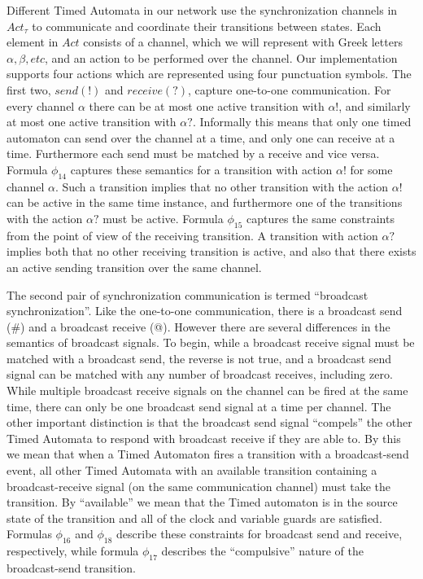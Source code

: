 \documentclass[a4paper,12pt]{article}
\begin{document}
Different Timed Automata in our network use the synchronization channels in
\(Act_\tau\) to communicate and coordinate their transitions between states.
Each element in \(Act\) consists of a channel, which we will represent with
Greek letters \(\alpha, \beta, etc\), and an action to be performed over the
channel. Our implementation supports four actions which are represented using
four punctuation symbols. The first two, \(send(!)\) and \(receive(?)\), capture
one-to-one communication. For every channel \(\alpha\) there can be at most one
active transition with \(\alpha!\), and similarly at most one active transition
with \(\alpha?\). Informally this means that only one timed automaton can send
over the channel at a time, and only one can receive at a time. Furthermore each
send must be matched by a receive and vice versa. Formula \(\phi_{14}\) captures
these semantics for a transition with action \(\alpha!\) for some channel
\(\alpha\). Such a transition implies that no other transition with the action
\(\alpha!\) can be active in the same time instance, and furthermore one of the
transitions with the action \(\alpha?\) must be active. Formula \(\phi_{15}\)
captures the same constraints from the point of view of the receiving
transition. A transition with action \(\alpha?\) implies both that no other
receiving transition is active, and also that there exists an active sending
transition over the same channel.

The second pair of synchronization communication is termed ``broadcast
synchronization''. Like the one-to-one communication, there is a broadcast send
(\#) and a broadcast receive (@). However there are several differences in the
semantics of broadcast signals. To begin, while a broadcast receive signal must
be matched with a broadcast send, the reverse is not true, and a broadcast send
signal can be matched with any number of broadcast receives, including zero.
While multiple broadcast receive signals on the channel can be fired at the same
time, there can only be one broadcast send signal at a time per channel. The
other important distinction is that the broadcast send signal ``compels'' the
other Timed Automata to respond with broadcast receive if they are able to. By
this we mean that when a Timed Automaton fires a transition with a broadcast-send event, all other Timed Automata with an available transition containing
a broadcast-receive signal (on the same communication channel) must take the
transition. By ``available'' we mean that the Timed automaton is in the source
state of the transition and all of the clock and variable guards are satisfied.
Formulas \(\phi_{16}\) and \(\phi_{18}\) describe these constraints for
broadcast send and receive, respectively, while formula \(\phi_{17}\) describes
the ``compulsive'' nature of the broadcast-send transition.
\end{document}
